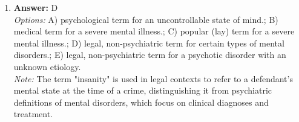 \documentclass[12pt]{article}
\begin{document}
\begin{enumerate}[label=\arabic*.]
\\ \textit{Note:} Dr. Manzetti's use of a sliding scale to adjust therapy fees based on clients' income demonstrates ethical practice by ensuring accessibility to mental health services, thereby prioritizing the well-being and financial circumstances of his clients.
\item \textbf{Answer:} D
\\ \textit{Options:} A) psychological term for an uncontrollable state of mind.; B) medical term for a severe mental illness.; C) popular (lay) term for a severe mental illness.; D) legal, non-psychiatric term for certain types of mental disorders.; E) legal, non-psychiatric term for a psychotic disorder with an unknown etiology.
\\ \textit{Note:} The term "insanity" is used in legal contexts to refer to a defendant's mental state at the time of a crime, distinguishing it from psychiatric definitions of mental disorders, which focus on clinical diagnoses and treatment.
\end{enumerate}
\end{document}
